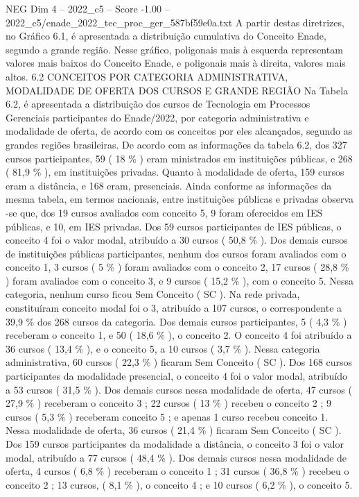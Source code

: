 \begin{textsample}{NEG Dim 4 – 2022\_c5 – Score -1.00 – 2022\_c5/enade\_2022\_tec\_proc\_ger\_587bf59e0a.txt}
A partir destas diretrizes, no Gráfico 6.1, é apresentada a distribuição cumulativa do Conceito Enade, segundo a grande região.
Nesse gráfico, poligonais mais à esquerda representam valores mais baixos do Conceito Enade, e poligonais mais à direita, valores mais altos. 6.2 CONCEITOS POR CATEGORIA ADMINISTRATIVA, MODALIDADE DE OFERTA DOS CURSOS E GRANDE REGIÃO Na Tabela 6.2, é apresentada a distribuição dos cursos de Tecnologia em Processos Gerenciais participantes do Enade/2022, por categoria administrativa e modalidade de oferta, de acordo com os conceitos por eles alcançados, segundo as grandes regiões brasileiras.
De acordo com as informações da tabela 6.2, dos 327 cursos participantes, 59 ( 18 \% ) eram ministrados em instituições públicas, e 268 ( 81,9 \% ), em instituições privadas.
Quanto à modalidade de oferta, 159 cursos eram a distância, e 168 eram, presenciais.
Ainda conforme as informações da mesma tabela, em termos nacionais, entre instituições públicas e privadas observa -se que, dos 19 cursos avaliados com conceito 5, 9 foram oferecidos em IES públicas, e 10, em IES privadas.
Dos 59 cursos participantes de IES públicas, o conceito 4 foi o valor modal, atribuído a 30 cursos ( 50,8 \% ).
Dos demais cursos de instituições públicas participantes, nenhum dos cursos foram avaliados com o conceito 1, 3 cursos ( 5 \% ) foram avaliados com o conceito 2, 17 cursos ( 28,8 \% ) foram avaliados com o conceito 3, e 9 cursos ( 15,2 \% ), com o conceito 5.
Nessa categoria, nenhum curso ficou Sem Conceito ( SC ).
Na rede privada, constituíram conceito modal foi o 3, atribuído a 107 cursos, o correspondente a 39,9 \% dos 268 cursos da categoria.
Dos demais cursos participantes, 5 ( 4,3 \% ) receberam o conceito 1, e 50 ( 18,6 \% ), o conceito 2.
O conceito 4 foi atribuído a 36 cursos ( 13,4 \% ), e o conceito 5, a 10 cursos ( 3,7 \% ).
Nessa categoria administrativa, 60 cursos ( 22,3 \% ) ficaram Sem Conceito ( SC ).
Dos 168 cursos participantes da modalidade presencial, o conceito 4 foi o valor modal, atribuído a 53 cursos ( 31,5 \% ).
Dos demais cursos nessa modalidade de oferta, 47 cursos ( 27,9 \% ) receberam o conceito 3 ; 22 cursos ( 13 \% ) recebeu o conceito 2 ; 9 cursos ( 5,3 \% ) receberam conceito 5 ; e apenas 1 curso recebeu conceito 1.
Nessa modalidade de oferta, 36 cursos ( 21,4 \% ) ficaram Sem Conceito ( SC ).
Dos 159 cursos participantes da modalidade a distância, o conceito 3 foi o valor modal, atribuído a 77 cursos ( 48,4 \% ).
Dos demais cursos nessa modalidade de oferta, 4 cursos ( 6,8 \% ) receberam o conceito 1 ; 31 cursos ( 36,8 \% ) recebeu o conceito 2 ; 13 cursos, ( 8,1 \% ), o conceito 4 ; e 10 cursos ( 6,2 \% ), o conceito 5.

\end{textsample}
